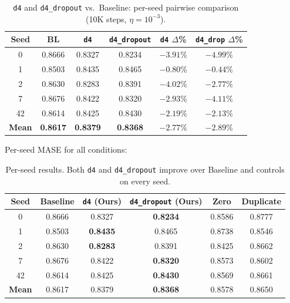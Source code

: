 \documentclass{article}
\begin{document}
\begin{table}[H]
\centering
\caption{\texttt{d4} and \texttt{d4\_dropout} vs.\ Baseline: per-seed pairwise comparison (10K steps, $\eta = 10^{-3}$).}
\small
\begin{tabular}{cccccc}
\toprule
\textbf{Seed} & \textbf{BL} & \textbf{\texttt{d4}} & \textbf{\texttt{d4\_dropout}} & \textbf{\texttt{d4} $\Delta$\%} & \textbf{\texttt{d4\_drop} $\Delta$\%} \\
\midrule
0 & 0.8666 & 0.8327 & 0.8234 & $-3.91\%$ & $-4.99\%$ \\
1 & 0.8503 & 0.8435 & 0.8465 & $-0.80\%$ & $-0.44\%$ \\
2 & 0.8630 & 0.8283 & 0.8391 & $-4.02\%$ & $-2.77\%$ \\
7 & 0.8676 & 0.8422 & 0.8320 & $-2.93\%$ & $-4.11\%$ \\
42 & 0.8614 & 0.8425 & 0.8430 & $-2.19\%$ & $-2.13\%$ \\
\midrule
\textbf{Mean} & \textbf{0.8617} & \textbf{0.8379} & \textbf{0.8368} & \textbf{$-2.77\%$} & \textbf{$-2.89\%$} \\
\bottomrule
\end{tabular}
\end{table}

Per-seed MASE for all conditions:

\begin{table}[H]
\centering
\caption{Per-seed results. Both \texttt{d4} and \texttt{d4\_dropout} improve over Baseline and controls on every seed.}
\small
\begin{tabular}{cccccc}
\toprule
\textbf{Seed} & \textbf{Baseline} & \textbf{\texttt{d4} (Ours)} & \textbf{\texttt{d4\_dropout} (Ours)} & \textbf{Zero} & \textbf{Duplicate} \\
\midrule
0 & 0.8666 & 0.8327 & \textbf{0.8234} & 0.8586 & 0.8777 \\
1 & 0.8503 & \textbf{0.8435} & 0.8465 & 0.8738 & 0.8546 \\
2 & 0.8630 & \textbf{0.8283} & 0.8391 & 0.8425 & 0.8662 \\
7 & 0.8676 & 0.8422 & \textbf{0.8320} & 0.8573 & 0.8602 \\
42 & 0.8614 & 0.8425 & \textbf{0.8430} & 0.8569 & 0.8661 \\
\midrule
\textbf{Mean} & 0.8617 & 0.8379 & \textbf{0.8368} & 0.8578 & 0.8650 \\
\bottomrule
\end{tabular}
\end{table}

\end{document}
